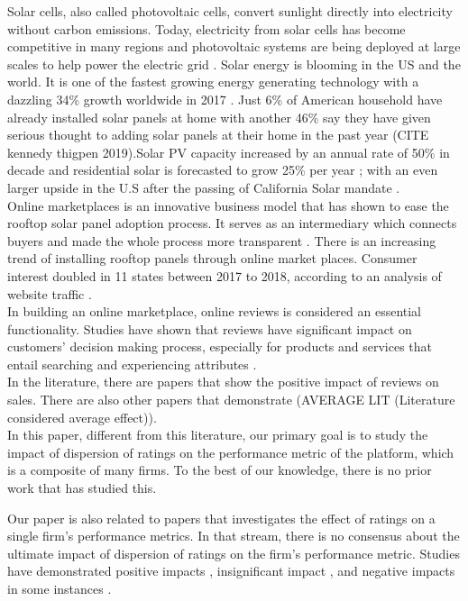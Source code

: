 \documentclass[msom,blindrev]{informs3}
\begin{document}
Solar cells, also called photovoltaic cells, convert sunlight directly into electricity without carbon emissions. Today, electricity from solar cells has become competitive in many regions and photovoltaic systems are being deployed at large scales to help power the electric grid \citep{nrel.gov}. 
Solar energy is blooming in the US and the world. It is one of the fastest growing energy generating technology with a dazzling 34\% growth worldwide in 2017 \citep{iea2018snapshot}. Just 6\% of American household have already installed solar panels at home with another 46\% say they have given serious thought to adding solar panels at their home in the past year (CITE kennedy thigpen 2019).Solar PV capacity increased by an annual rate of 50\%  in decade and residential solar is forecasted to grow 25\% per year \citep{weaver_2019,seia}; with an even larger upside in the U.S after the passing of California Solar mandate \citep{gtmsolar2018}. \\ 
Online marketplaces is an innovative business model that has shown to ease the rooftop solar panel adoption process. It serves as an intermediary which connects buyers and made the whole process more transparent \citep{dorsey2019access}. There is an increasing trend of installing rooftop panels through online market places. Consumer interest doubled in 11 states between 2017 to 2018, according to an analysis of website traffic \citep{energysageintel19}.  \\
In building an online marketplace, online reviews is considered an essential functionality. Studies have shown that reviews have significant impact on customers'  decision making process, especially for products and services that entail searching and experiencing attributes \citep{zimmermann2018decomposing}.  \\
In the literature, there are papers that show the positive impact of reviews on sales. There are also other papers that demonstrate  (AVERAGE LIT (Literature considered average effect)).\\
In this paper, different from this literature, our primary goal is to study the impact of dispersion of ratings on the  performance metric of the platform, which is a composite of many firms. To the best of our knowledge, there is no prior work that has studied this. 

Our paper is also related to papers that investigates the effect of ratings on a single firm's performance metrics. In that stream, there is no consensus about the ultimate impact of dispersion of ratings on the firm's performance metric. Studies have demonstrated positive impacts \citep{chintagunta2010effects,chevalier2006effect,dellarocas2007exploring}, insignificant impact \citep{duan2008online}, and negative impacts in some instances \citep{wang2015user}. 
\end{document}
